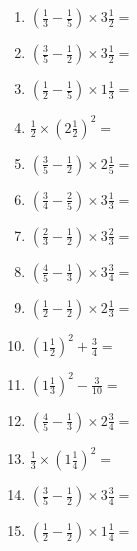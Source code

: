 \documentclass[12pt]{article}
\begin{document}
\begin{enumerate}
\newpage
\item \large $ \left( \frac{1}{3} - \frac{1}{5} \right) \times 3 \frac{1}{2} = $ \vspace{1.6cm}
\item \large $ \left( \frac{3}{5} - \frac{1}{2} \right) \times 3 \frac{1}{2} = $ \vspace{1.6cm}
\item \large $ \left( \frac{1}{2} - \frac{1}{5} \right) \times 1 \frac{1}{3} = $ \vspace{1.6cm}
\item \large $ \frac{1}{2} \times \left( 2 \frac{1}{2} \right)^2 = $ \vspace{1.6cm}
\item \large $ \left( \frac{3}{5} - \frac{1}{2} \right) \times 2 \frac{1}{5} = $ \vspace{1.6cm}
\item \large $ \left( \frac{3}{4} - \frac{2}{5} \right) \times 3 \frac{1}{3} = $ \vspace{1.6cm}
\item \large $ \left( \frac{2}{3} - \frac{1}{2} \right) \times 3 \frac{2}{3} = $ \vspace{1.6cm}
\item \large $ \left( \frac{4}{5} - \frac{1}{3} \right) \times 3 \frac{3}{4} = $ \vspace{1.6cm}
\item \large $ \left( \frac{1}{2} - \frac{1}{2} \right) \times 2 \frac{1}{3} = $ \vspace{1.6cm}
\item \large $ \left( 1 \frac{1}{2} \right)^2 + \frac{3}{4} = $ \vspace{1.6cm}
\newpage
\item \large $ \left( 1 \frac{1}{3} \right)^2 - \frac{3}{10} = $ \vspace{1.6cm}
\item \large $ \left( \frac{4}{5} - \frac{1}{3} \right) \times 2 \frac{3}{4} = $ \vspace{1.6cm}
\item \large $ \frac{1}{3} \times \left( 1 \frac{1}{4} \right)^2 = $ \vspace{1.6cm}
\item \large $ \left( \frac{3}{5} - \frac{1}{2} \right) \times 3 \frac{3}{4} = $ \vspace{1.6cm}
\item \large $ \left( \frac{1}{2} - \frac{1}{2} \right) \times 1 \frac{1}{4} = $ \vspace{1.6cm}

\end{enumerate}
\end{document}
